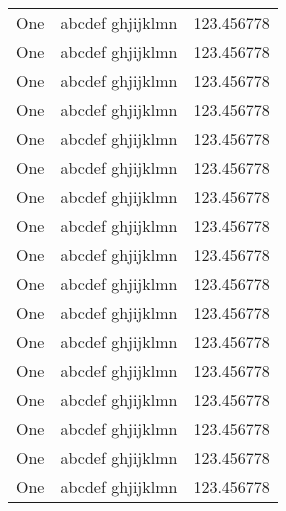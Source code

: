 \documentclass[a11paper]{article}
\begin{document}
\begin{center}
\begin{longtable}{lll}
		One                                                & abcdef ghjijklmn                           & 123.456778                                \\
		One                                                & abcdef ghjijklmn                           & 123.456778                                \\
		One                                                & abcdef ghjijklmn                           & 123.456778                                \\
		One                                                & abcdef ghjijklmn                           & 123.456778                                \\
		One                                                & abcdef ghjijklmn                           & 123.456778                                \\
		One                                                & abcdef ghjijklmn                           & 123.456778                                \\
		One                                                & abcdef ghjijklmn                           & 123.456778                                \\
		One                                                & abcdef ghjijklmn                           & 123.456778                                \\
		One                                                & abcdef ghjijklmn                           & 123.456778                                \\
		One                                                & abcdef ghjijklmn                           & 123.456778                                \\
		One                                                & abcdef ghjijklmn                           & 123.456778                                \\
		One                                                & abcdef ghjijklmn                           & 123.456778                                \\
		One                                                & abcdef ghjijklmn                           & 123.456778                                \\
		One                                                & abcdef ghjijklmn                           & 123.456778                                \\
		One                                                & abcdef ghjijklmn                           & 123.456778                                \\
		One                                                & abcdef ghjijklmn                           & 123.456778                                \\
		One                                                & abcdef ghjijklmn                           & 123.456778
	\end{longtable}
\end{center}
\end{document}

